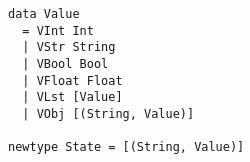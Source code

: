 \begin{verbatim}
data Value
  = VInt Int
  | VStr String
  | VBool Bool
  | VFloat Float
  | VLst [Value]
  | VObj [(String, Value)]

newtype State = [(String, Value)]
\end{verbatim}
